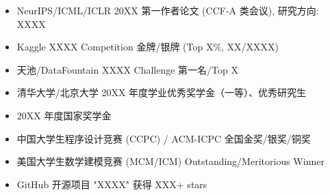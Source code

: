 \documentclass[zh]{resume}
\begin{document}
\begin{itemize}
    \item NeurIPS/ICML/ICLR 20XX 第一作者论文 (CCF-A 类会议), 研究方向: XXXX
    \item Kaggle XXXX Competition 金牌/银牌 (Top X\%, XX/XXXX)
    \item 天池/DataFountain XXXX Challenge 第一名/Top X
    \item 清华大学/北京大学 20XX 年度学业优秀奖学金（一等）、优秀研究生
    \item 20XX 年度国家奖学金
    \item 中国大学生程序设计竞赛 (CCPC) / ACM-ICPC 全国金奖/银奖/铜奖
    \item 美国大学生数学建模竞赛 (MCM/ICM) Outstanding/Meritorious Winner
    \item GitHub 开源项目 "XXXX" 获得 XXX+ stars
\end{itemize}
\end{document}
